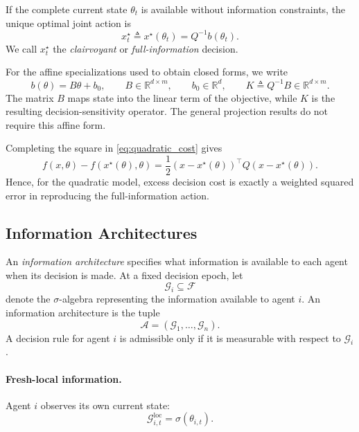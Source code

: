 \documentclass[11pt]{article}
\begin{document}
If the complete current state $\theta_t$ is available without information
constraints, the unique optimal joint action is
\begin{equation}
    x_t^\star
    \triangleq
    x^\star(\theta_t)
    =
    Q^{-1}b(\theta_t).
    \label{eq:clairvoyant}
\end{equation}
We call $x_t^\star$ the \emph{clairvoyant} or \emph{full-information}
decision.

For the affine specializations used to obtain closed forms, we write
\begin{equation}
    b(\theta)=B\theta+b_0,
    \qquad
    B\in\mathbb{R}^{d\times m},
    \qquad
    b_0\in\mathbb{R}^{d},
    \qquad
    K\triangleq Q^{-1}B\in\mathbb{R}^{d\times m}.
    \label{eq:affine_map_and_sensitivity}
\end{equation}
The matrix $B$ maps state into the linear term of the objective, while $K$ is
the resulting decision-sensitivity operator. The general projection results do
not require this affine form.

Completing the square in \eqref{eq:quadratic_cost} gives
\begin{equation}
    f(x,\theta)-f(x^\star(\theta),\theta)
    =
    \frac{1}{2}
    \left(x-x^\star(\theta)\right)^\top
    Q
    \left(x-x^\star(\theta)\right).
    \label{eq:complete_square}
\end{equation}
Hence, for the quadratic model, excess decision cost is exactly a weighted
squared error in reproducing the full-information action.

\subsection{Information Architectures}
\label{subsec:architectures}

An \emph{information architecture} specifies what information is available to
each agent when its decision is made. At a fixed decision epoch, let
\[
    \mathcal{G}_i\subseteq\mathcal{F}
\]
denote the $\sigma$-algebra representing the information available to agent
$i$. An information architecture is the tuple
\begin{equation}
    \mathcal{A}
    =
    (\mathcal{G}_1,\ldots,\mathcal{G}_n).
    \label{eq:architecture}
\end{equation}
A decision rule for agent $i$ is admissible only if it is measurable with
respect to $\mathcal{G}_i$.

\paragraph{Fresh-local information.}
Agent $i$ observes its own current state:
\begin{equation}
    \mathcal{G}_{i,t}^{\mathrm{loc}}
    =
    \sigma\!\left(
        \theta_{i,t}
    \right).
    \label{eq:fresh_local_arch}
\end{equation}
\end{document}
